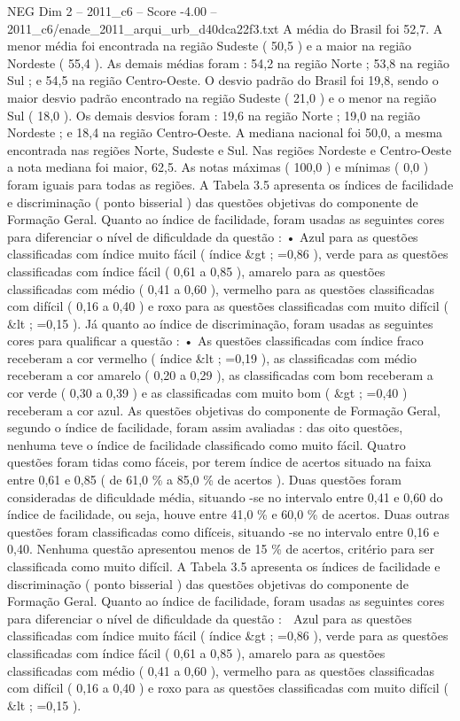 \begin{textsample}{NEG Dim 2 – 2011\_c6 – Score -4.00 – 2011\_c6/enade\_2011\_arqui\_urb\_d40dca22f3.txt}
A média do Brasil foi 52,7.
A menor média foi encontrada na região Sudeste ( 50,5 ) e a maior na região Nordeste ( 55,4 ).
As demais médias foram : 54,2 na região Norte ; 53,8 na região Sul ; e 54,5 na região Centro-Oeste.
O desvio padrão do Brasil foi 19,8, sendo o maior desvio padrão encontrado na região Sudeste ( 21,0 ) e o menor na região Sul ( 18,0 ).
Os demais desvios foram : 19,6 na região Norte ; 19,0 na região Nordeste ; e 18,4 na região Centro-Oeste.
A mediana nacional foi 50,0, a mesma encontrada nas regiões Norte, Sudeste e Sul.
Nas regiões Nordeste e Centro-Oeste a nota mediana foi maior, 62,5.
As notas máximas ( 100,0 ) e mínimas ( 0,0 ) foram iguais para todas as regiões.
A Tabela 3.5 apresenta os índices de facilidade e discriminação ( ponto bisserial ) das questões objetivas do componente de Formação Geral.
Quanto ao índice de facilidade, foram usadas as seguintes cores para diferenciar o nível de dificuldade da questão : • Azul para as questões classificadas com índice muito fácil ( índice \&gt ; =0,86 ), verde para as questões classificadas com índice fácil ( 0,61 a 0,85 ), amarelo para as questões classificadas com médio ( 0,41 a 0,60 ), vermelho para as questões classificadas com difícil ( 0,16 a 0,40 ) e roxo para as questões classificadas com muito difícil ( \&lt ; =0,15 ).
Já quanto ao índice de discriminação, foram usadas as seguintes cores para qualificar a questão : • As questões classificadas com índice fraco receberam a cor vermelho ( índice \&lt ; =0,19 ), as classificadas com médio receberam a cor amarelo ( 0,20 a 0,29 ), as classificadas com bom receberam a cor verde ( 0,30 a 0,39 ) e as classificadas com muito bom ( \&gt ; =0,40 ) receberam a cor azul.
As questões objetivas do componente de Formação Geral, segundo o índice de facilidade, foram assim avaliadas : das oito questões, nenhuma teve o índice de facilidade classificado como muito fácil.
Quatro questões foram tidas como fáceis, por terem índice de acertos situado na faixa entre 0,61 e 0,85 ( de 61,0 \% a 85,0 \% de acertos ).
Duas questões foram consideradas de dificuldade média, situando -se no intervalo entre 0,41 e 0,60 do índice de facilidade, ou seja, houve entre 41,0 \% e 60,0 \% de acertos.
Duas outras questões foram classificadas como difíceis, situando -se no intervalo entre 0,16 e 0,40.
Nenhuma questão apresentou menos de 15 \% de acertos, critério para ser classificada como muito difícil.
A Tabela 3.5 apresenta os índices de facilidade e discriminação ( ponto bisserial ) das questões objetivas do componente de Formação Geral.
Quanto ao índice de facilidade, foram usadas as seguintes cores para diferenciar o nível de dificuldade da questão :  Azul para as questões classificadas com índice muito fácil ( índice \&gt ; =0,86 ), verde para as questões classificadas com índice fácil ( 0,61 a 0,85 ), amarelo para as questões classificadas com médio ( 0,41 a 0,60 ), vermelho para as questões classificadas com difícil ( 0,16 a 0,40 ) e roxo para as questões classificadas com muito difícil ( \&lt ; =0,15 ).

\end{textsample}
